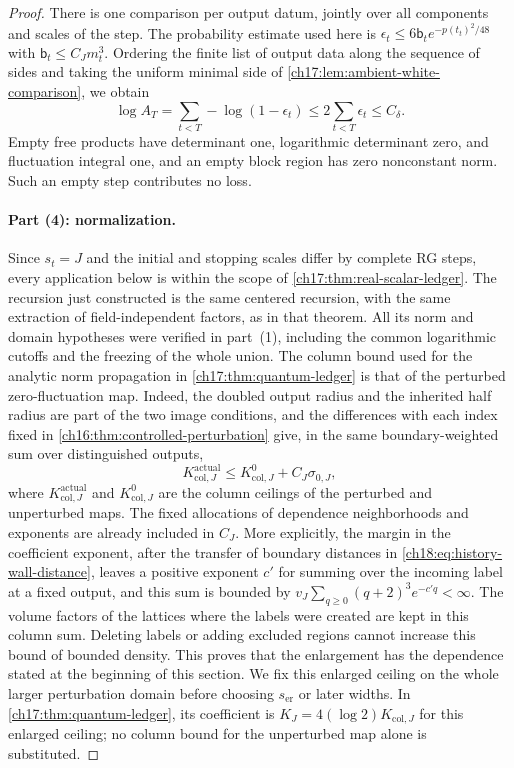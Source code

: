 \begin{proof}
There is one comparison per output datum, jointly over all components and scales of the step. The probability estimate used here is $\epsilon_t\le6\mathsf b_te^{-p(t_t)^2/48}$ with $\mathsf b_t\le C_Jm_t^3$. Ordering the finite list of output data along the sequence of sides and taking the uniform minimal side of \cref{ch17:lem:ambient-white-comparison}, we obtain
\[
 \log A_T=\sum_{t<T}-\log(1-\epsilon_t)
       \le2\sum_{t<T}\epsilon_t\le C_\delta.
\]
Empty free products have determinant one, logarithmic determinant zero, and fluctuation integral one, and an empty block region has zero nonconstant norm. Such an empty step contributes no loss.

\paragraph{Part (4): normalization.}
Since $s_t=J$ and the initial and stopping scales differ by complete RG steps, every application below is within the scope of \cref{ch17:thm:real-scalar-ledger}. The recursion just constructed is the same centered recursion, with the same extraction of field-independent factors, as in that theorem. All its norm and domain hypotheses were verified in part~(1), including the common logarithmic cutoffs and the freezing of the whole union. The column bound used for the analytic norm propagation in \cref{ch17:thm:quantum-ledger} is that of the perturbed zero-fluctuation map. Indeed, the doubled output radius and the inherited half radius are part of the two image conditions, and the differences with each index fixed in \cref{ch16:thm:controlled-perturbation} give, in the same boundary-weighted sum over distinguished outputs,
\[
 K_{\mathrm{col},J}^{\mathrm{actual}}
       \le K_{\mathrm{col},J}^{0}+C_J\sigma_{0,J},
\]
where $K_{\mathrm{col},J}^{\mathrm{actual}}$ and $K_{\mathrm{col},J}^{0}$ are the column ceilings of the perturbed and unperturbed maps. The fixed allocations of dependence neighborhoods and exponents are already included in $C_J$. More explicitly, the margin in the coefficient exponent, after the transfer of boundary distances in \eqref{ch18:eq:history-wall-distance}, leaves a positive exponent $c'$ for summing over the incoming label at a fixed output, and this sum is bounded by $v_J\sum_{q\ge0}(q+2)^3e^{-c'q}<\infty$. The volume factors of the lattices where the labels were created are kept in this column sum. Deleting labels or adding excluded regions cannot increase this bound of bounded density. This proves that the enlargement has the dependence stated at the beginning of this section. We fix this enlarged ceiling on the whole larger perturbation domain before choosing $s_{\mathrm{er}}$ or later widths. In \cref{ch17:thm:quantum-ledger}, its coefficient is $K_J=4(\log2)K_{\mathrm{col},J}$ for this enlarged ceiling; no column bound for the unperturbed map alone is substituted.


\end{proof}
